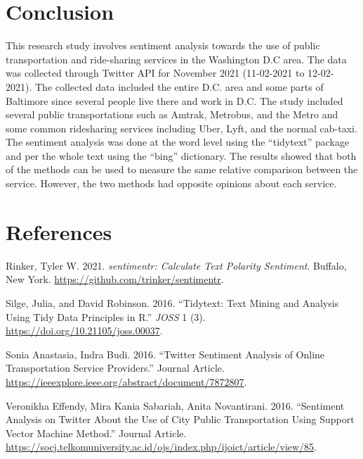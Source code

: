 \documentclass[
  12pt,
]{article}
\begin{document}
\hypertarget{conclusion}{%
\section{Conclusion}\label{conclusion}}

This research study involves sentiment analysis towards the use of
public transportation and ride-sharing services in the Washington D.C
area. The data was collected through Twitter API for November 2021
(11-02-2021 to 12-02-2021). The collected data included the entire D.C.
area and some parts of Baltimore since several people live there and
work in D.C. The study included several public transportations such as
Amtrak, Metrobus, and the Metro and some common ridesharing services
including Uber, Lyft, and the normal cab-taxi. The sentiment analysis
was done at the word level using the ``tidytext'' package and per the
whole text using the ``bing'' dictionary. The results showed that both
of the methods can be used to measure the same relative comparison
between the service. However, the two methods had opposite opinions
about each service.

\newpage

\hypertarget{references}{%
\section*{References}\label{references}}

\hypertarget{refs}{}
\leavevmode\hypertarget{ref-sentimentr}{}%
Rinker, Tyler W. 2021. \emph{sentimentr: Calculate Text Polarity
Sentiment}. Buffalo, New York.
\url{https://github.com/trinker/sentimentr}.

\leavevmode\hypertarget{ref-tidytext}{}%
Silge, Julia, and David Robinson. 2016. ``Tidytext: Text Mining and
Analysis Using Tidy Data Principles in R.'' \emph{JOSS} 1 (3).
\url{https://doi.org/10.21105/joss.00037}.

\leavevmode\hypertarget{ref-Sonia16}{}%
Sonia Anastasia, Indra Budi. 2016. ``Twitter Sentiment Analysis of
Online Transportation Service Providers.'' Journal Article.
\url{https://ieeexplore.ieee.org/abstract/document/7872807}.

\leavevmode\hypertarget{ref-Effendy16}{}%
Veronikha Effendy, Mira Kania Sabariah, Anita Novantirani. 2016.
``Sentiment Analysis on Twitter About the Use of City Public
Transportation Using Support Vector Machine Method.'' Journal Article.
\url{https://socj.telkomuniversity.ac.id/ojs/index.php/ijoict/article/view/85}.
\end{document}
